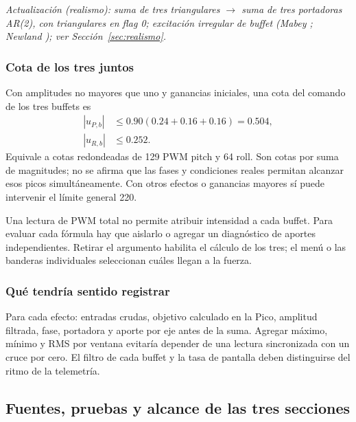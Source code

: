 \textit{Actualización (realismo): suma de tres triangulares $\rightarrow$ suma de tres portadoras AR(2), con triangulares en flag 0; excitación irregular de buffet (Mabey \cite{mabey1988}; Newland \cite{newland1993}); ver Sección~\ref{sec:realismo}.}

\subsubsection{Cota de los tres juntos}
Con amplitudes no mayores que uno y ganancias iniciales, una cota del comando de los tres buffets es
\begin{align}
|u_{P,b}|&\le0.90(0.24+0.16+0.16)=0.504,\\
|u_{R,b}|&\le0.252.
\end{align}
Equivale a cotas redondeadas de 129 PWM pitch y 64 roll. Son cotas por suma de magnitudes; no se afirma que las fases y condiciones reales permitan alcanzar esos picos simultáneamente. Con otros efectos o ganancias mayores sí puede intervenir el límite general 220.

Una lectura de PWM total no permite atribuir intensidad a cada buffet. Para evaluar cada fórmula hay que aislarlo o agregar un diagnóstico de aportes independientes. Retirar el argumento  habilita el cálculo de los tres; el menú o las banderas individuales seleccionan cuáles llegan a la fuerza.

\subsubsection{Qué tendría sentido registrar}
Para cada efecto: entradas crudas, objetivo calculado en la Pico, amplitud filtrada, fase, portadora y aporte por eje antes de la suma. Agregar máximo, mínimo y RMS por ventana evitaría depender de una lectura sincronizada con un cruce por cero. El filtro de cada buffet y la tasa de pantalla deben distinguirse del ritmo de la telemetría.

\subsection{Fuentes, pruebas y alcance de las tres secciones}
